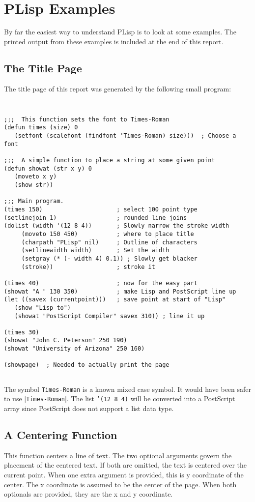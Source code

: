 \section{PLisp Examples}
By far the easiest way to understand PLisp is to look at some examples.
The printed output from these examples is included at the end of this report.

\subsection{The Title Page}
The title page of this report was generated by the following small program:
{\tt
\begin{verbatim}
;;;  This function sets the font to Times-Roman
(defun times (size) 0
   (setfont (scalefont (findfont 'Times-Roman) size)))  ; Choose a font

;;;  A simple function to place a string at some given point
(defun showat (str x y) 0
   (moveto x y)
   (show str))

;;; Main program.
(times 150)                     ; select 100 point type
(setlinejoin 1)                 ; rounded line joins
(dolist (width '(12 8 4))       ; Slowly narrow the stroke width
     (moveto 150 450)           ; where to place title
     (charpath "PLisp" nil)     ; Outline of characters
     (setlinewidth width)       ; Set the width
     (setgray (* (- width 4) 0.1)) ; Slowly get blacker
     (stroke))                  ; stroke it

(times 40)                      ; now for the easy part
(showat "A " 130 350)           ; make Lisp and PostScript line up
(let ((savex (currentpoint)))   ; save point at start of "Lisp"
   (show "Lisp to")    
   (showat "PostScript Compiler" savex 310)) ; line it up

(times 30)
(showat "John C. Peterson" 250 190)
(showat "University of Arizona" 250 160)

(showpage)  ; Needed to actually print the page


\end{verbatim}
}
The symbol {\tt Times-Roman} is a known mixed case symbol.  It would have
been safer to use {\tt $|$Times-Roman$|$}.  The list {\tt '(12 8 4)}
will be converted into a PostScript array since PostScript does not
support a list data type.

\subsection{A Centering Function}
This function centers a line of text.  The two optional arguments govern
the placement of the centered text.  If both are omitted, the text
is centered over the current point.  When one extra argument is
provided, this is y coordinate of the center.  The x
coordinate is assumed to be the center of the page.  When both
optionals are provided, they are the x and y coordinate.

